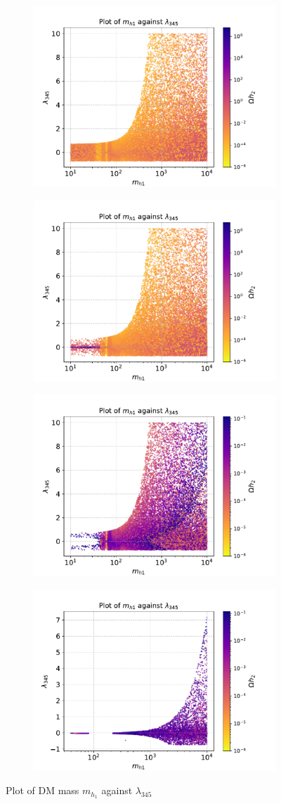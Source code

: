 \documentclass[12pt]{article}
\begin{document}
\begin{figure}[H]
    \begin{subfigure}{\textwidth}
      \centering
      \includegraphics[width=0.5\columnwidth]{plots/MD1_l345_cut1.pdf}
    \end{subfigure}%
    \begin{subfigure}{\textwidth}
      \centering
      \includegraphics[width=0.5\columnwidth]{plots/MD1_l345_cut1cut2.pdf}
    \end{subfigure}
    \begin{subfigure}{\textwidth}
      \centering
      \includegraphics[width=0.5\columnwidth]{plots/MD1_l345_cut1cut2cut3.pdf}
    \end{subfigure}
    \begin{subfigure}{\textwidth}
      \centering
      \includegraphics[width=0.5\columnwidth]{plots/MD1_l345_cut1cut2cut3cut4.pdf}
    \end{subfigure}
    \caption{Plot of DM mass $m_{h_1}$ against $\lambda_{345}$}
\end{figure}
\end{document}
